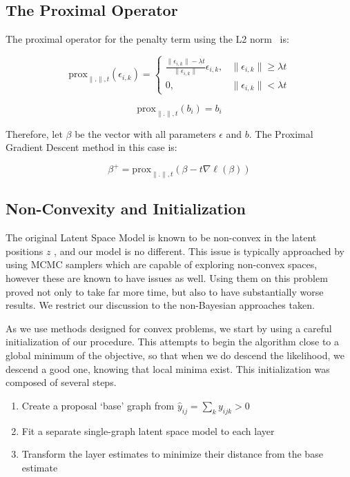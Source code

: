 \documentclass{article}
\begin{document}
\subsection{The Proximal Operator}

The proximal operator for the penalty term using the L2 norm\footnotemark~ is:


\[
\text{prox}_{\|.\|, t}(\epsilon_{i,k}) = 
\begin{cases}
\frac{\|\epsilon_{i,k}\| - \lambda t}{\|\epsilon_{i,k}\|}\epsilon_{i,k}, & \|\epsilon_{i,k}\| \ge \lambda t \\
0, & \|\epsilon_{i,k}\| < \lambda t
\end{cases}
\]

\[
\text{prox}_{\|.\|, t}(b_i) = b_i
\]

Therefore, let $\beta$ be the vector with all parameters $\epsilon$ and $b$. The Proximal Gradient Descent method in this case is:

\[
\beta^{+} = \text{prox}_{\|.\|, t}(\beta - t \nabla \ell(\beta))
\]

\subsection{Non-Convexity and Initialization}
The original Latent Space Model is known to be non-convex in the latent positions $z$ \cite{Hoff2002}, and our model is no different. This issue is typically approached by using MCMC samplers \cite{Hoff2002, Carpenter2017} which are capable of exploring non-convex spaces, however these are known to have issues as well. Using them on this problem proved not only to take far more time, but also to have substantially worse results. We restrict our discussion to the non-Bayesian approaches taken.

As we use methods designed for convex problems, we start by using a careful initialization of our procedure. This attempts to begin the algorithm close to a global minimum of the objective, so that when we do descend the likelihood, we descend a good one, knowing that local minima exist. This initialization was composed of several steps.
\\
\begin{enumerate}
\item Create a proposal `base' graph from $\hat{y}_{ij} =\sum_k y_{ijk} > 0$
\item Fit a separate single-graph latent space model to each layer
\item Transform the layer estimates to minimize their distance from the base estimate
\end{enumerate}
\end{document}
